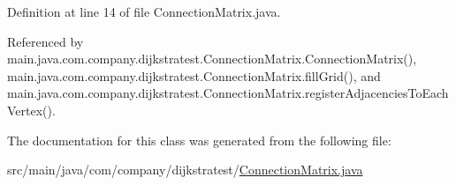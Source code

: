 Definition at line 14 of file Connection\-Matrix.\-java.



Referenced by main.\-java.\-com.\-company.\-dijkstratest.\-Connection\-Matrix.\-Connection\-Matrix(), main.\-java.\-com.\-company.\-dijkstratest.\-Connection\-Matrix.\-fill\-Grid(), and main.\-java.\-com.\-company.\-dijkstratest.\-Connection\-Matrix.\-register\-Adjacencies\-To\-Each\-Vertex().



The documentation for this class was generated from the following file\-:\begin{DoxyCompactItemize}
\item 
src/main/java/com/company/dijkstratest/\hyperlink{_connection_matrix_8java}{Connection\-Matrix.\-java}\end{DoxyCompactItemize}
